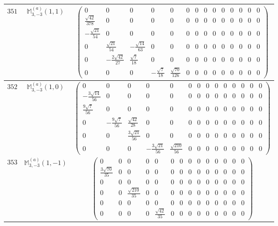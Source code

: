 \documentclass[fleqn,8pt,landscape]{jsarticle}
\begin{document}
\begin{center}
\begin{longtable}{ccc}
$ 351 $ & $ \mathbb{M}_{3,-3}^{(a)}(1,1) $ & $ \begin{pmatrix} 0 & 0 & 0 & 0 & 0 & 0 & 0 & 0 & 0 & 0 & 0 & 0 & 0 & 0 \\ \frac{\sqrt{42}}{378} & 0 & 0 & 0 & 0 & 0 & 0 & 0 & 0 & 0 & 0 & 0 & 0 & 0 \\ - \frac{\sqrt{21}}{54} & 0 & 0 & 0 & 0 & 0 & 0 & 0 & 0 & 0 & 0 & 0 & 0 & 0 \\ 0 & \frac{\sqrt{21}}{54} & - \frac{\sqrt{14}}{63} & 0 & 0 & 0 & 0 & 0 & 0 & 0 & 0 & 0 & 0 & 0 \\ 0 & - \frac{2 \sqrt{42}}{27} & \frac{\sqrt{7}}{18} & 0 & 0 & 0 & 0 & 0 & 0 & 0 & 0 & 0 & 0 & 0 \\ 0 & 0 & 0 & - \frac{\sqrt{7}}{18} & \frac{\sqrt{70}}{126} & 0 & 0 & 0 & 0 & 0 & 0 & 0 & 0 & 0 \end{pmatrix} $ \\ \hline
$ 352 $ & $ \mathbb{M}_{3,-3}^{(a)}(1,0) $ & $ \begin{pmatrix} 0 & 0 & 0 & 0 & 0 & 0 & 0 & 0 & 0 & 0 & 0 & 0 & 0 & 0 \\ - \frac{3 \sqrt{14}}{56} & 0 & 0 & 0 & 0 & 0 & 0 & 0 & 0 & 0 & 0 & 0 & 0 & 0 \\ \frac{9 \sqrt{7}}{56} & 0 & 0 & 0 & 0 & 0 & 0 & 0 & 0 & 0 & 0 & 0 & 0 & 0 \\ 0 & - \frac{9 \sqrt{7}}{56} & \frac{\sqrt{42}}{28} & 0 & 0 & 0 & 0 & 0 & 0 & 0 & 0 & 0 & 0 & 0 \\ 0 & 0 & \frac{3 \sqrt{21}}{56} & 0 & 0 & 0 & 0 & 0 & 0 & 0 & 0 & 0 & 0 & 0 \\ 0 & 0 & 0 & - \frac{3 \sqrt{21}}{56} & \frac{\sqrt{210}}{56} & 0 & 0 & 0 & 0 & 0 & 0 & 0 & 0 & 0 \end{pmatrix} $ \\ \hline
$ 353 $ & $ \mathbb{M}_{3,-3}^{(a)}(1,-1) $ & $ \begin{pmatrix} 0 & 0 & 0 & 0 & 0 & 0 & 0 & 0 & 0 & 0 & 0 & 0 & 0 & 0 \\ \frac{3 \sqrt{70}}{35} & 0 & 0 & 0 & 0 & 0 & 0 & 0 & 0 & 0 & 0 & 0 & 0 & 0 \\ 0 & 0 & 0 & 0 & 0 & 0 & 0 & 0 & 0 & 0 & 0 & 0 & 0 & 0 \\ 0 & 0 & \frac{\sqrt{210}}{35} & 0 & 0 & 0 & 0 & 0 & 0 & 0 & 0 & 0 & 0 & 0 \\ 0 & 0 & 0 & 0 & 0 & 0 & 0 & 0 & 0 & 0 & 0 & 0 & 0 & 0 \\ 0 & 0 & 0 & 0 & \frac{\sqrt{42}}{35} & 0 & 0 & 0 & 0 & 0 & 0 & 0 & 0 & 0 \end{pmatrix} $ \\ \hline

\end{longtable}
\end{center}
\end{document}
